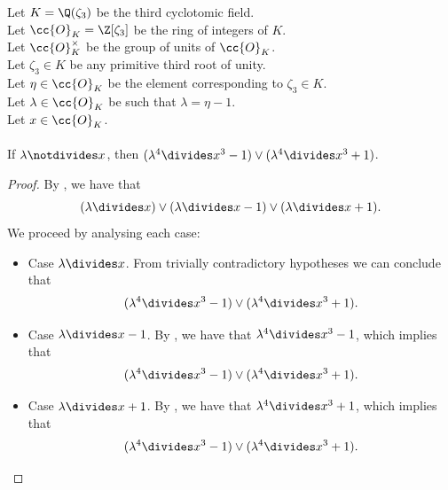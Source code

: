 \begin{lemma}
    \label{lmm:lambda_pow_four_dvd_cube_sub_one_or_add_one_of_lambda_not_dvd}
    \leanok
    Let $K = \Q(\zeta_3)$ be the third cyclotomic field. \\
    Let $\cc{O}_K = \Z[\zeta_3]$ be the ring of integers of $K$. \\
    Let $\cc{O}^\times_K$ be the group of units of $\cc{O}_K$. \\
    Let $\zeta_3 \in K$ be any primitive third root of unity. \\
    Let $\eta \in \cc{O}_K$ be the element corresponding to $\zeta_3 \in K$. \\
    Let $\lambda \in \cc{O}_K$ be such that $\lambda = \eta -1$. \\
    Let $x \in \cc{O}_K$. \\\\
    If $\lambda \notdivides x$, then $(\lambda^4 \divides x^3 - 1)
    \lor (\lambda^4 \divides x^3 + 1)$.
\end{lemma}
\begin{proof}
    \leanok
    By , we have that
    $$(\lambda \divides x) \lor (\lambda \divides x-1) \lor (\lambda \divides x+1).$$
    We proceed by analysing each case:
    \begin{itemize}
        \item Case $\lambda \divides x$. From trivially contradictory hypotheses we can conclude that
        $$(\lambda^4 \divides x^3 - 1) \lor (\lambda^4 \divides x^3 + 1).$$
        \item Case $\lambda \divides x-1$. By ,
        we have that $\lambda^ 4 \divides x^3 - 1$, which implies that
        $$(\lambda^4 \divides x^3 - 1) \lor (\lambda^4 \divides x^3 + 1).$$
        \item Case $\lambda \divides x+1$. By ,
        we have that $\lambda^ 4 \divides x^3 + 1$, which implies that
        $$(\lambda^4 \divides x^3 - 1) \lor (\lambda^4 \divides x^3 + 1).$$
    \end{itemize}
\end{proof}


